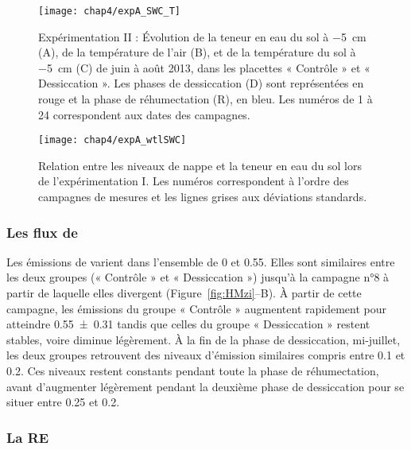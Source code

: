 \begin{figure}
\centering
\texttt{[image: chap4/expA\_SWC\_T]}
\caption{Expérimentation II : Évolution de la teneur en eau du sol à \SI{-5}{\centi\metre} (A), de la température de l'air (B), et de la température du sol à \SI{-5}{\centi\metre} (C) de juin à août 2013, dans les placettes « Contrôle » et « Dessiccation ». Les phases de dessiccation (D) sont représentées en rouge et la phase de réhumectation (R), en bleu. Les numéros de 1 à 24 correspondent aux dates des campagnes.}
\label{fig:HMzi_T}
\end{figure}


\begin{figure}
\centering
\texttt{[image: chap4/expA\_wtlSWC]}
\caption{Relation entre les niveaux de nappe et la teneur en eau du sol lors de l'expérimentation I. Les numéros correspondent à l'ordre des campagnes de mesures et les lignes grises aux déviations standards.}
\label{fig:wtlSWC_A}
\end{figure}

\subsubsection{Les flux de \chh}

Les émissions de \chh varient dans l'ensemble de 0 et \SI{0.55}{\uml}.
Elles sont similaires entre les deux groupes (« Contrôle » et « Dessiccation ») jusqu'à la campagne n°8 à partir de laquelle elles divergent (Figure~\ref{fig:HMzi}--B).
À partir de cette campagne, les émissions du groupe « Contrôle » augmentent rapidement pour atteindre \SI{0.55(031)}{\uml} tandis que celles du groupe « Dessiccation » restent stables, voire diminue légèrement.
À la fin de la phase de dessiccation, mi-juillet, les deux groupes retrouvent des niveaux d'émission similaires compris entre \num{0.1} et \SI{0.2}{\uml}.
Ces niveaux restent constants pendant toute la phase de réhumectation, avant d'augmenter légèrement pendant la deuxième phase de dessiccation pour se situer entre \SI{0.25}{\uml} et \SI{0.2}{\uml}.

\subsubsection{La RE}

